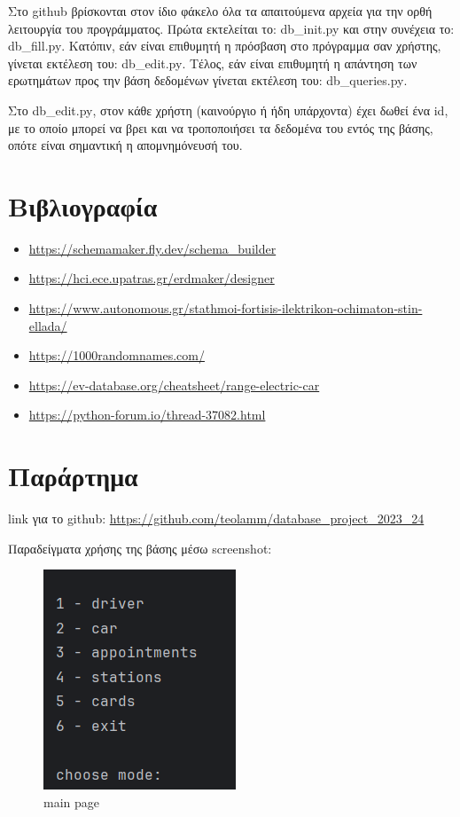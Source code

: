 \documentclass[manuscript,screen,review]{acmart}
\newcommand{\en}[1]{\foreignlanguage{english}{#1}}
\begin{document}
Στο \en{github} βρίσκονται στον ίδιο φάκελο όλα τα απαιτούμενα αρχεία για την ορθή λειτουργία του 
προγράμματος. Πρώτα εκτελείται το: \en{db\_init.py} και στην συνέχεια το: \en{db\_fill.py}.
Κατόπιν, εάν είναι επιθυμητή η πρόσβαση στο πρόγραμμα σαν χρήστης, γίνεται εκτέλεση του:
\en{db\_edit.py}. Τέλος, εάν είναι επιθυμητή η απάντηση των ερωτημάτων προς την βάση δεδομένων
γίνεται εκτέλεση του: \en{db\_queries.py}.

Στο \en{db\_edit.py}, στον κάθε χρήστη (καινούργιο ή ήδη υπάρχοντα) έχει δωθεί ένα \en{id}, με το 
οποίο μπορεί να βρει και να τροποποιήσει τα δεδομένα του εντός της βάσης, οπότε είναι σημαντική
η απομνημόνευσή του.

\section{Βιβλιογραφία}

\begin{itemize}
\item \en{\url{https://schemamaker.fly.dev/schema_builder}}
\item \en{\url{https://hci.ece.upatras.gr/erdmaker/designer}}
\item \en{\url{https://www.autonomous.gr/stathmoi-fortisis-ilektrikon-ochimaton-stin-ellada/}}
\item \en{\url{https://1000randomnames.com/}}
\item \en{\url{https://ev-database.org/cheatsheet/range-electric-car}}
\item \en{\url{https://python-forum.io/thread-37082.html}}
\end{itemize}

\newpage
\section{Παράρτημα}

\en{link} για το \en{github}: \en{\url{https://github.com/teolamm/database_project_2023_24}}

Παραδείγματα χρήσης της βάσης μέσω \en{screenshot}:

\begin{figure}[H]
    \centering
    \includegraphics[width=.3\textwidth]{./db_edit_1.png}
    \caption{\en{main page}}
\end{figure}
\end{document}
